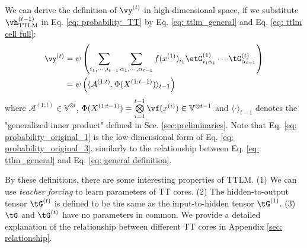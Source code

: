 We can derive  the definition of $\vy^{(t)}$ in high-dimensional space, if we substitute $\vh^{(t-1)}_{\textrm{TTLM}}$ in  Eq. \ref{eq: probability_TT}  by Eq. \ref{eq: ttlm_general} and Eq. \ref{eq: ttlm cell full}:
%
\begin{align} \small
      \vy^{(t)} &= \psi \left( \sum_{i_1, \cdots, i_{t-1}} \sum_{\alpha_1,\cdots, \alpha_{t-1}} f(x^{(1)})_{i_1}\etG^{(1)}_{i_1\alpha_1} \cdots \tG^{(t)}_{\alpha_{t-1}}  \right) \label{eq: probability_original_1} \\
    &=  \psi \left(\langle \mathcal{A}^{(1:t)}, \Phi(X^{(1: t-1)}) \rangle_{t-1} \right)  \label{eq: probability_original_3}
\end{align}
%
where $\mathcal{A}^{(1:t)}\in \mathbb{V}^{\otimes t}$,  $\Phi(X^{(1: t-1)}) = \bigotimes\limits^{t-1}_{i=1}  \vf(x^{(i)}) \in \mathbb{V}^{\otimes t-1}$ and $\langle \cdot \rangle_{t-1}$ denotes the "generalized inner product" defined in Sec. \ref{sec:preliminaries}. Note that Eq. \ref{eq: probability_original_1} is the low-dimensional form of Eq. \ref{eq: probability_original_3}, similarly to the relationship between Eq. \ref{eq: ttlm_general} and Eq. \ref{eq: general definition}.




By these definitions, there are some interesting properties of TTLM. (1) We can use \emph{teacher forcing} \citep{marcus1998rethinking} to learn parameters of TT cores. (2)  The hidden-to-output  tensor $\tG^{(t)}$ is defined to be the same as the input-to-hidden tensor $\tG^{(1)}$. (3) $\tG$ and $\tG^{(t)}$ have no parameters in common. We provide a detailed explanation of the  relationship between different TT cores in Appendix \ref{sec: relationship}. 




